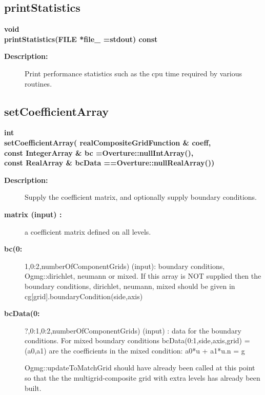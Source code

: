\subsection{printStatistics}
 
\begin{flushleft} \textbf{%
void  \\ 
\settowidth{\OgmgIncludeArgIndent}{printStatistics(}%
printStatistics(FILE *file\_  =stdout) const
}\end{flushleft}
\begin{description}
\item[{\bf Description:}] 
   Print performance statistics such as the cpu time required by various routines.

\end{description}
\subsection{setCoefficientArray}
 
\begin{flushleft} \textbf{%
int  \\ 
\settowidth{\OgmgIncludeArgIndent}{setCoefficientArray(}%
setCoefficientArray( realCompositeGridFunction \& coeff,\\ 
const IntegerArray \& bc   =Overture::nullIntArray(),\\ 
const RealArray \& bcData  ==Overture::nullRealArray())
}\end{flushleft}
\begin{description}
\item[{\bf Description:}] 
    Supply the coefficient matrix, and optionally supply boundary conditions.
\item[{\bf matrix (input) :}]  a coefficient matrix defined on all levels.

\item[{\bf bc(0:}] 1,0:2,numberOfComponentGrids) (input): boundary conditions, Ogmg::dirichlet, neumann or mixed.
    If this array is NOT supplied then the boundary conditions, dirichlet, neumann, mixed should be
  given in cg[grid].boundaryCondition(side,axis)
\item[{\bf bcData(0:}] ?,0:1,0:2,numberOfComponentGrids) (input) : data for the boundary conditions.
    For mixed boundary conditions bcData(0:1,side,axis,grid) = (a0,a1) are the coefficients in the 
    mixed condition: a0*u + a1*u.n = g

 Ogmg::updateToMatchGrid should have already been called at this point so that
 the the multigrid-composite grid with extra levels has already been built.
\end{description}
